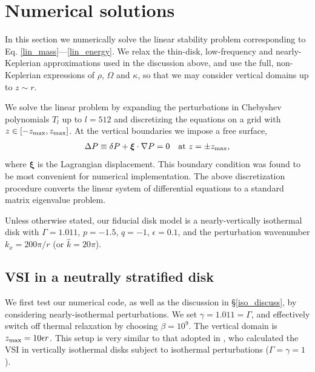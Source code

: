 \section{Numerical solutions}
In this section we numerically solve the linear stability problem
corresponding to Eq. \ref{lin_mass}---\ref{lin_energy}. 
We relax the thin-disk, low-frequency and nearly-Keplerian
approximations used in the discussion above, and 
use the full, non-Keplerian expressions of $\rho$, $\Omega$ and
$\kappa$, so that we may consider vertical domains up to $z\sim r$.  


We solve the linear problem by expanding the
perturbations in Chebyshev polynomials $T_l$ up to $l=512$
and discretizing the equations on a grid with
$z\in[-z_\mathrm{max},z_\mathrm{max}]$. At the vertical boundaries we impose a free
surface, 
\begin{align}
  \Delta P \equiv \delta P + \bm{\xi}\cdot\nabla P= 0 \quad \text{at } z=\pm z_\mathrm{max},
\end{align}
where $\bm{\xi}$ is the Lagrangian displacement. This boundary
condition was found to be most convenient for numerical
implementation. The above discretization procedure converts the linear  
system of differential equations to a standard matrix eigenvalue
problem.     

Unless otherwise stated, our fiducial disk model is a
nearly-vertically isothermal disk with $\Gamma=1.011$, $p=-1.5$,
$q=-1$, $\epsilon=0.1$, and the perturbation wavenumber $k_x = 200\pi/r$
(or $\hat{k}=20\pi$). 


\subsection{VSI in a neutrally stratified disk}\label{vertiso_pertiso} 
We first test our numerical code, as well as the discussion in
\S\ref{iso_discuss}, by considering nearly-isothermal
perturbations. We set $\gamma=1.011=\Gamma$, and effectively switch
off thermal relaxation by choosing $\beta=10^9$. The vertical domain is
$z_\mathrm{max} = 10\epsilon r$. This setup is very similar to that adopted in
\cite{mcnally14}, who calculated the VSI in vertically isothermal
disks subject to isothermal perturbations ($\Gamma=\gamma=1$).  


